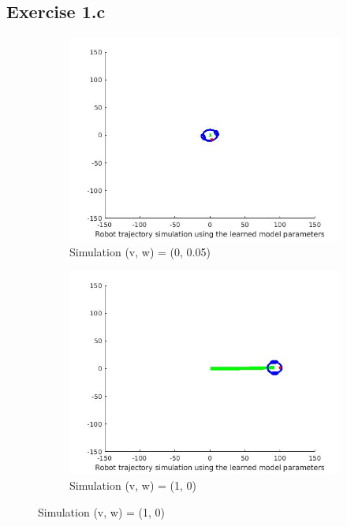 \documentclass{article}
\begin{document}
\subsection*{Exercise 1.c}
\begin{figure}[ht]
	\begin{subfigure}{.5\textwidth}
		\centering
		\includegraphics[width=1.\linewidth]{1.jpg}  
		\caption{Simulation (v, w) = (0, 0.05)}
		\label{fig:sub-first}
	\end{subfigure}
	\begin{subfigure}{.5\textwidth}
		\centering
		\includegraphics[width=1.\linewidth]{2.jpg}  
		\caption{Simulation (v, w) = (1, 0)}
		\label{fig:sub-second}

\end{subfigure}
\end{figure}
\end{document}

